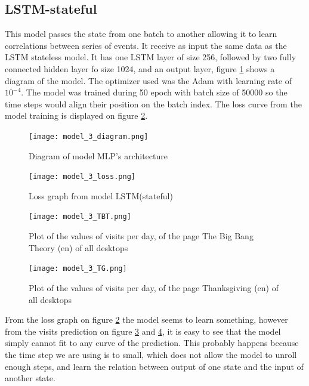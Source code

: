 \subsection{LSTM-stateful}

This model passes the state from one batch to another allowing it to learn correlations between series of events.
It receive as input the same data as the LSTM stateless model.
It has one LSTM layer of size 256, followed by two fully connected hidden layer fo size 1024,
and an output layer, figure \ref{fig:mode_3_diagram} shows a diagram of the model.
The optimizer used was the Adam with learning rate of $10^{-4}$.
The model was trained during 50 epoch with batch size of 50000 so the time steps would align their position on the batch index.
The loss curve from the model training is displayed on figure \ref{fig:model_3_loss}.

\begin{figure}
	\centering
	\texttt{[image: model\_3\_diagram.png]}
	\caption{Diagram of model MLP's architecture\label{fig:mode_3_diagram}}
\end{figure}

\begin{figure}
	\centering
	\texttt{[image: model\_3\_loss.png]}
	\caption{Loss graph from model LSTM(stateful)\label{fig:model_3_loss}}
\end{figure}

\begin{figure}
	\centering
	\texttt{[image: model\_3\_TBT.png]}
	\caption{Plot of the values of visits per day, of the page The Big Bang Theory (en) of all desktops\label{fig:model_3_TBT}}
\end{figure}

\begin{figure}
	\centering
	\texttt{[image: model\_3\_TG.png]}
	\caption{Plot of the values of visits per day, of the page Thanksgiving (en) of all desktops\label{fig:model_3_TG}}
\end{figure}

From the loss graph on figure \ref{fig:model_3_loss} the model seems to learn something,
however from the visits prediction on figure \ref{fig:model_3_TBT} and \ref{fig:model_3_TG},
it is easy to see that the model simply cannot fit to any curve of the prediction.
This probably happens because the time step we are using is to small, which does not allow the model to unroll enough steps,
and learn the relation between output of one state and the input of another state.